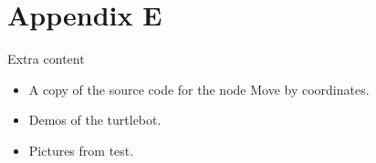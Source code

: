 \chapter{Appendix E}
Extra content 
\begin{itemize}
    \item A copy of the source code for the node Move by coordinates.
    \item Demos of the turtlebot.
    \item Pictures from test.
\end{itemize}